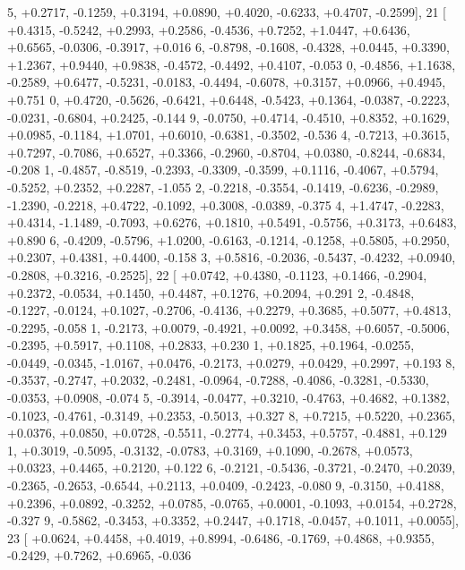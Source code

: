 \begin{DoxyCode}
      5, +0.2717, -0.1259, +0.3194, +0.0890, +0.4020, -0.6233, +0.4707, -0.2599],
21 [ +0.4315, -0.5242, +0.2993, +0.2586, -0.4536, +0.7252, +1.0447, +0.6436, +0.6565, -0.0306, -0.3917, +0.016
      6, -0.8798, -0.1608, -0.4328, +0.0445, +0.3390, +1.2367, +0.9440, +0.9838, -0.4572, -0.4492, +0.4107, -0.053
      0, -0.4856, +1.1638, -0.2589, +0.6477, -0.5231, -0.0183, -0.4494, -0.6078, +0.3157, +0.0966, +0.4945, +0.751
      0, +0.4720, -0.5626, -0.6421, +0.6448, -0.5423, +0.1364, -0.0387, -0.2223, -0.0231, -0.6804, +0.2425, -0.144
      9, -0.0750, +0.4714, -0.4510, +0.8352, +0.1629, +0.0985, -0.1184, +1.0701, +0.6010, -0.6381, -0.3502, -0.536
      4, -0.7213, +0.3615, +0.7297, -0.7086, +0.6527, +0.3366, -0.2960, -0.8704, +0.0380, -0.8244, -0.6834, -0.208
      1, -0.4857, -0.8519, -0.2393, -0.3309, -0.3599, +0.1116, -0.4067, +0.5794, -0.5252, +0.2352, +0.2287, -1.055
      2, -0.2218, -0.3554, -0.1419, -0.6236, -0.2989, -1.2390, -0.2218, +0.4722, -0.1092, +0.3008, -0.0389, -0.375
      4, +1.4747, -0.2283, +0.4314, -1.1489, -0.7093, +0.6276, +0.1810, +0.5491, -0.5756, +0.3173, +0.6483, +0.890
      6, -0.4209, -0.5796, +1.0200, -0.6163, -0.1214, -0.1258, +0.5805, +0.2950, +0.2307, +0.4381, +0.4400, -0.158
      3, +0.5816, -0.2036, -0.5437, -0.4232, +0.0940, -0.2808, +0.3216, -0.2525],
22 [ +0.0742, +0.4380, -0.1123, +0.1466, -0.2904, +0.2372, -0.0534, +0.1450, +0.4487, +0.1276, +0.2094, +0.291
      2, -0.4848, -0.1227, -0.0124, +0.1027, -0.2706, -0.4136, +0.2279, +0.3685, +0.5077, +0.4813, -0.2295, -0.058
      1, -0.2173, +0.0079, -0.4921, +0.0092, +0.3458, +0.6057, -0.5006, -0.2395, +0.5917, +0.1108, +0.2833, +0.230
      1, +0.1825, +0.1964, -0.0255, -0.0449, -0.0345, -1.0167, +0.0476, -0.2173, +0.0279, +0.0429, +0.2997, +0.193
      8, -0.3537, -0.2747, +0.2032, -0.2481, -0.0964, -0.7288, -0.4086, -0.3281, -0.5330, -0.0353, +0.0908, -0.074
      5, -0.3914, -0.0477, +0.3210, -0.4763, +0.4682, +0.1382, -0.1023, -0.4761, -0.3149, +0.2353, -0.5013, +0.327
      8, +0.7215, +0.5220, +0.2365, +0.0376, +0.0850, +0.0728, -0.5511, -0.2774, +0.3453, +0.5757, -0.4881, +0.129
      1, +0.3019, -0.5095, -0.3132, -0.0783, +0.3169, +0.1090, -0.2678, +0.0573, +0.0323, +0.4465, +0.2120, +0.122
      6, -0.2121, -0.5436, -0.3721, -0.2470, +0.2039, -0.2365, -0.2653, -0.6544, +0.2113, +0.0409, -0.2423, -0.080
      9, -0.3150, +0.4188, +0.2396, +0.0892, -0.3252, +0.0785, -0.0765, +0.0001, -0.1093, +0.0154, +0.2728, -0.327
      9, -0.5862, -0.3453, +0.3352, +0.2447, +0.1718, -0.0457, +0.1011, +0.0055],
23 [ +0.0624, +0.4458, +0.4019, +0.8994, -0.6486, -0.1769, +0.4868, +0.9355, -0.2429, +0.7262, +0.6965, -0.036

\end{DoxyCode}
